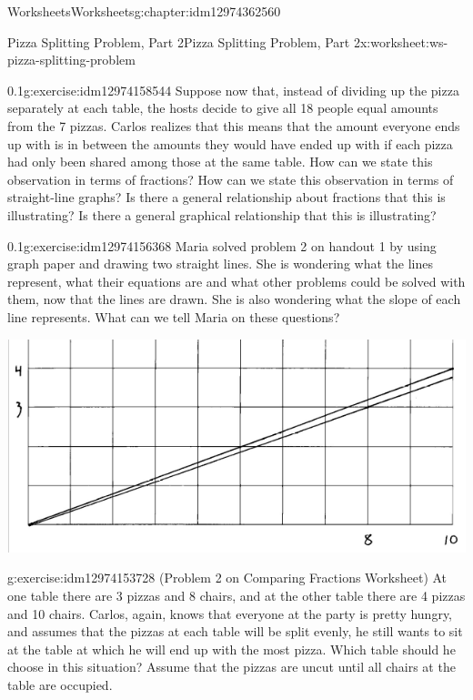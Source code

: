 \documentclass[twoside,11pt,]{book}
\begin{document}
\begin{chapterptx}{Worksheets}{}{Worksheets}{}{}{g:chapter:idm12974362560}
\begin{worksheet-section-numberless}{Pizza Splitting Problem, Part 2}{}{Pizza Splitting Problem, Part 2}{}{}{x:worksheet:ws-pizza-splitting-problem}
\begin{divisionexercise}{2}{}{0.1}{g:exercise:idm12974158544}
Suppose now that, instead of dividing up the pizza separately at each table, the hosts decide to give all 18 people equal amounts from the 7 pizzas.  Carlos realizes that this means that the amount everyone ends up with is in between the amounts they would have ended up with if each pizza had only been shared among those at the same table.  How can we state this observation in terms of fractions?  How can we state this observation in terms of straight-line graphs?  Is there a general relationship about fractions that this is illustrating?  Is there a general graphical relationship that this is illustrating?%
\end{divisionexercise}%
\clearpage
\begin{divisionexercise}{3}{}{0.1}{g:exercise:idm12974156368}%
Maria solved problem 2 on handout 1 by using graph paper and drawing two straight lines.  She is wondering what the lines represent, what their equations are and what other problems could be solved with them, now that the lines are drawn.  She is also wondering what the slope of each line represents.  What can we tell Maria on these questions?%
\begin{sidebyside}{1}{0.05}{0.05}{0}%
\begin{sbspanel}{0.9}%
\includegraphics[width=1\linewidth]{images/pizza-splitting-problem.png}
\end{sbspanel}%
\end{sidebyside}%
\end{divisionexercise}%
\begin{divisionexercise}{4}{}{}{g:exercise:idm12974153728}%
(Problem 2 on Comparing Fractions Worksheet) At one table there are 3 pizzas and 8 chairs, and at the other table there are 4 pizzas and 10 chairs.  Carlos, again, knows that everyone at the party is pretty hungry, and assumes that the pizzas at each table will be split evenly, he still wants to sit at the table at which he will end up with the most pizza.  Which table should he choose in this situation? Assume that the pizzas are uncut until all chairs at the table are occupied.%

\end{divisionexercise}
\end{worksheet-section-numberless}
\end{chapterptx}
\end{document}
